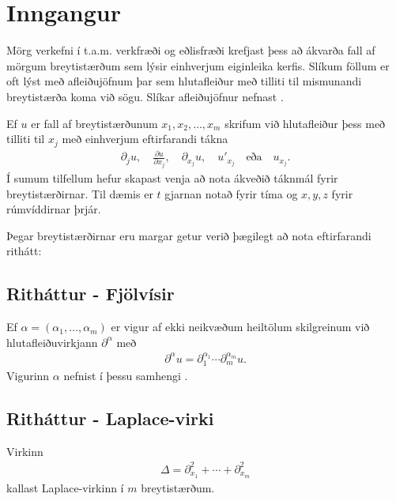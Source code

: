 \documentclass[a4paper,10pt,icelandic]{sphinxmanual}
\begin{document}
\section{Inngangur}
\label{\detokenize{Kafli01:inngangur}}
Mörg verkefni í t.a.m. verkfræði og eðlisfræði krefjast þess að ákvarða fall af mörgum breytistærðum sem lýsir einhverjum eiginleika kerfis. Slíkum föllum er oft lýst með afleiðujöfnum þar sem hlutafleiður með tilliti til mismunandi breytistærða koma við sögu. Slíkar afleiðujöfnur nefnast .

Ef \(u\) er fall af breytistærðunum \(x_1,x_2,\ldots,x_m\) skrifum við hlutafleiður þess með tilliti til \(x_j\) með
einhverjum eftirfarandi tákna
\begin{equation*}
\begin{split}\partial_j u, \quad \frac{\partial u}{\partial x_j},\quad  \partial_{x_j} u, \quad u'_{x_j} \quad \text{eða}\quad  u_{x_j}.\end{split}
\end{equation*}
Í sumum tilfellum hefur skapast venja að nota ákveðið táknmál fyrir breytistærðirnar. Til dæmis er \(t\) gjarnan notað fyrir tíma og \(x,y,z\) fyrir rúmvíddirnar þrjár.

Þegar breytistærðirnar eru margar getur verið þægilegt að nota eftirfarandi rithátt:


\subsection{Ritháttur - Fjölvísir}
\label{\detokenize{Kafli01:rithattur-fjolvisir}}
Ef \(\alpha = (\alpha_1,\ldots,\alpha_m)\) er vigur af ekki neikvæðum heiltölum skilgreinum við hlutafleiðuvirkjann \(\partial^\alpha\) með
\begin{equation*}
\begin{split}\partial^\alpha u = \partial_1^{\alpha_1}\cdots \partial_m^{\alpha_m} u.\end{split}
\end{equation*}
Vigurinn \(\alpha\) nefnist í þessu samhengi .


\subsection{Ritháttur - Laplace-virki}
\label{\detokenize{Kafli01:rithattur-laplace-virki}}
Virkinn
\begin{equation*}
\begin{split}\Delta = \partial_{x_1}^2+\cdots + \partial_{x_m}^2\end{split}
\end{equation*}
kallast Laplace-virkinn í \(m\) breytistærðum.
\end{document}
